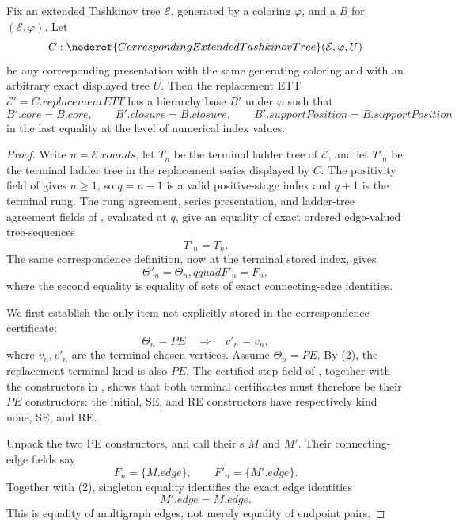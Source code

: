 \begin{lemma}
Fix an extended Tashkinov tree \(\mathcal E\), generated by a coloring
\(\varphi\), and a  \(B\) for
\((\mathcal E,\varphi)\).  Let
\[
 C:\noderef{CorrespondingExtendedTashkinovTree}
       (\mathcal E,\varphi,U)
\]
be any corresponding presentation with the same generating coloring and
with an arbitrary exact displayed tree \(U\).  Then the replacement ETT
\(\mathcal E'=C.\mathit{replacementETT}\) has a hierarchy base \(B'\)
under \(\varphi\) such that
\[
 B'.\mathit{core}=B.\mathit{core},\qquad
 B'.\mathit{closure}=B.\mathit{closure},\qquad
 B'.\mathit{supportPosition}=B.\mathit{supportPosition}
\]
in the last equality at the level of numerical index values.
\end{lemma}
\begin{proof}
Write \(n=\mathcal E.\mathit{rounds}\), let \(T_n\) be the terminal ladder
tree of \(\mathcal E\), and let \(T'_n\) be the terminal ladder tree in the
replacement series displayed by \(C\).  The positivity field of
 gives \(n\geq1\), so \(q=n-1\) is a valid
positive-stage index and \(q+1\) is the terminal rung.  The rung agreement,
series presentation, and ladder-tree agreement fields of
, evaluated at \(q\), give an
equality of exact ordered edge-valued tree-sequences
\[
                         T'_n=T_n.                              \tag{1}
\]
The same correspondence definition, now at the terminal stored index,
gives
\[
 \Theta'_n=\Theta_n,qquad F'_n=F_n,                            \tag{2}
\]
where the second equality is equality of sets of exact connecting-edge
identities.

We first establish the only item not explicitly stored in the
correspondence certificate:
\[
 \Theta_n=PE\quad\Longrightarrow\quad v'_n=v_n,                 \tag{3}
\]
where \(v_n,v'_n\) are the terminal chosen vertices.  Assume
\(\Theta_n=PE\).  By (2), the replacement terminal kind is also \(PE\).
The certified-step field of , together with the
constructors in , shows that both terminal
certificates must therefore be their \(PE\) constructors: the initial,
SE, and RE constructors have respectively kind none, SE, and RE.

Unpack the two PE constructors, and call their
s \(M\) and \(M'\).  Their connecting-edge
fields say
\[
                         F_n=\{M.\mathit{edge}\},
 \qquad F'_n=\{M'.\mathit{edge}\}.
\]
Together with (2), singleton equality identifies the exact edge identities
\[
                         M'.\mathit{edge}=M.\mathit{edge}.       \tag{4}
\]
This is equality of multigraph edges, not merely equality of endpoint
pairs.


\end{proof}

